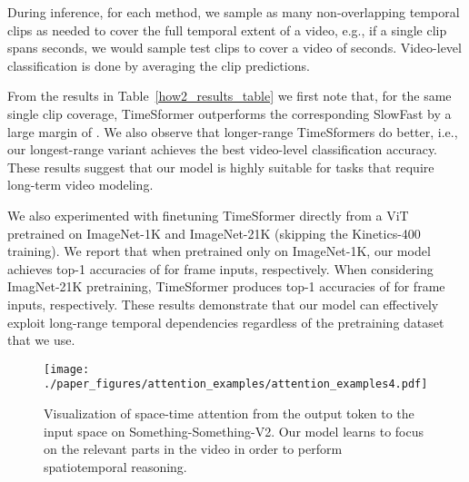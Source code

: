 \documentclass{article}
\begin{document}
During inference, for each method, we sample as many non-overlapping temporal clips as needed to cover the full temporal extent of a video, e.g., if a single clip spans  seconds, we would sample  test clips to cover a video of  seconds. Video-level classification is done by averaging the clip predictions.





From the results in Table~\ref{how2_results_table} we first note that, for the same single clip coverage, TimeSformer outperforms the corresponding SlowFast by a large margin of . We also observe that longer-range TimeSformers do better, i.e., our longest-range variant achieves the best video-level classification accuracy. These results suggest that our model is highly suitable for tasks that require long-term video modeling. 

We also experimented with finetuning TimeSformer directly from a ViT pretrained on ImageNet-1K and ImageNet-21K (skipping the Kinetics-400 training). We report that when pretrained only on ImageNet-1K, our model achieves top-1 accuracies of  for  frame inputs, respectively. When considering ImagNet-21K pretraining, TimeSformer produces  top-1 accuracies of  for  frame inputs, respectively. These results demonstrate that our model can effectively exploit long-range temporal dependencies regardless of the pretraining dataset that we use.




















\begin{figure}
\begin{center}
   \texttt{[image: ./paper\_figures/attention\_examples/attention\_examples4.pdf]}
\end{center}
\vspace{-0.4cm}
        \caption{Visualization of space-time attention from the output token to the input space on Something-Something-V2. Our model learns to focus on the relevant parts in the video in order to perform spatiotemporal reasoning.\vspace{-0.2cm}} \label{attention_ex_fig}
\end{figure}
\end{document}
